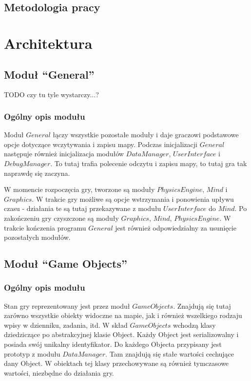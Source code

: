 \documentclass[licencjacka]{pracamgr}
\begin{document}
  \section{Metodologia pracy}

\chapter{Architektura}
  \section{Moduł ``General''}
    TODO czy tu tyle wystarczy...?
    \subsection{Ogólny opis modułu}
      Moduł $General$ łączy wszystkie pozostałe moduły i daje graczowi podstawowe opcje dotyczące wczytywania i zapisu
      mapy. Podczas inicjalizacji $General$ następuje również inicjalizacja modułów $DataManager$, $UserInterface$ i
      $DebugManager$. To tutaj trafia polecenie odczytu i zapisu mapy, to tutaj gra tak naprawdę się zaczyna.

      W momencie rozpoczęcia gry, tworzone są moduły $PhysicsEngine$, $Mind$ i $Graphics$. W trakcie gry możliwe są
      opcje wstrzymania i ponowienia upływu czasu - działania te są tutaj przekazywane z modułu $UserInterface$ do
      $Mind$. Po zakończeniu gry czyszczone są moduły $Graphics$, $Mind$, $PhysicsEngine$. W trakcie kończenia programu
      $General$ jest również odpowiedzialny za usunięcie pozostałych modułów.

  \section{Moduł ``Game Objects''}
    \subsection{Ogólny opis modułu}
      Stan gry reprezentowany jest przez moduł $GameObjects$. Znajdują się tutaj zarówno wszystkie obiekty widoczne na
      mapie, jak i również wszelkiego rodzaju wpisy w dzienniku, zadania, itd. W skład $GameObjects$ wchodzą klasy
      dziedziczące po abstrakcyjnej klasie Object. Każdy Object jest serializowalny i posiada swój unikalny
      identyfikator. Do każdego Objecta przypisany jest prototyp z modułu $DataManager$. Tam znajdują się stałe
      wartości cechujące dany Object. W obiektach tej klasy przechowywane są również tymczasowe wartości, niezbędne
      do działania gry.
\end{document}
